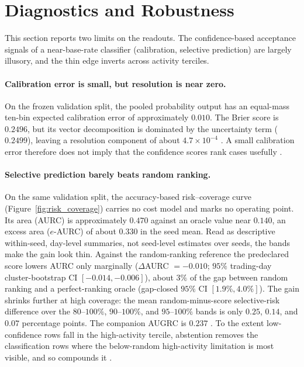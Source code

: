 \section{Diagnostics and Robustness}
\label{sec:diagnostics}

This section reports two limits on the readouts. The confidence-based acceptance
signals of a near-base-rate classifier (calibration, selective prediction) are
largely illusory, and the thin edge inverts across activity terciles.

\paragraph{Calibration error is small, but resolution is near zero.}
On the frozen validation split, the pooled probability output has an equal-mass
ten-bin expected calibration error of approximately $0.010$. The Brier score is
$0.2496$, but its vector decomposition is dominated by the uncertainty term
($0.2499$), leaving a resolution component of about $4.7\times10^{-4}$
\cite{brier1950verification,murphy1973vector}. A small calibration error
therefore does not imply that the confidence scores rank cases usefully
\cite{guo2017calibration}.

\paragraph{Selective prediction barely beats random ranking.}
On the same validation split, the accuracy-based risk--coverage curve
(Figure~\ref{fig:risk_coverage}) carries no cost model and marks no operating
point. Its area (AURC) is approximately $0.470$ against an oracle value near
$0.140$, an excess area ($e$-AURC) of about $0.330$ in the seed mean. Read as
descriptive within-seed, day-level summaries, not seed-level estimates over
\numseeds{} seeds, the bands make the gain look thin.
Against the random-ranking reference the predeclared score lowers AURC only
marginally (\(\Delta\)AURC \(=-0.010\); \(95\%\) trading-day cluster-bootstrap CI
\([-0.014,-0.006]\)), about $3\%$ of the gap between random ranking and a
perfect-ranking oracle (gap-closed \(95\%\) CI \([1.9\%,4.0\%]\)). The gain
shrinks further at high coverage: the mean random-minus-score selective-risk
difference over the \(80\)--\(100\%\), \(90\)--\(100\%\), and \(95\)--\(100\%\)
bands is only \(0.25\), \(0.14\), and \(0.07\) percentage points. The companion
AUGRC is $0.237$
\cite{geifman2017selective,geifman2019selectivenet,elyaniv2010foundations,traub2024overcoming}.
To the extent low-confidence rows fall in the high-activity tercile, abstention
removes the classification rows where the below-random high-activity limitation
is most visible, and so compounds it \cite{chalkidis2021trading}.

